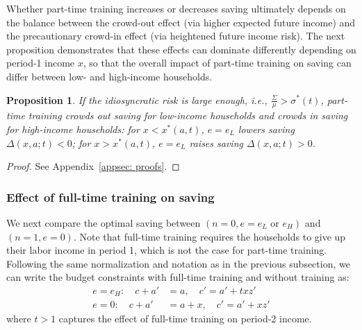\documentclass[12pt]{article}
\newtheorem{proposition}{Proposition}
\begin{document}
Whether part-time training increases or decreases saving ultimately depends on the balance between the crowd-out effect (via higher expected future income) and the precautionary crowd-in effect (via heightened future income risk). The next proposition demonstrates that these effects can dominate differently depending on period-1 income $x$, so that the overall impact of part-time training on saving can differ between low- and high-income households.



\begin{proposition}\label{prop:dadt}
    If the idiosyncratic risk is large enough, i.e., $\frac{\Sigma}{\mu}>\sigma^*(t)$, part-time training crowds out saving for low-income households and crowds in saving for high-income households: 
    for $x<x^\ast(a,t)$, $e=e_L$ lowers saving $\Delta(x,a;t)<0$; for $x>x^\ast(a,t)$, $e=e_L$ raises saving $\Delta(x,a;t)>0$.
\end{proposition}
\begin{proof}
    See Appendix~\ref{appsec: proofs}.
\end{proof}


\subsubsection{Effect of full-time training on saving}
We next compare the optimal saving between $(n=0,e=e_L \text{ or } e_H)$ and $(n=1,e=0)$. Note that  full-time training requires the households to give up their labor income in period 1, which is not the case for part-time training. Following the same normalization and notation as in the previous subsection, we can write the budget constraints with full-time training and without training as:
\begin{align}
e=e_H: \quad c + a' &= a, \quad c' = a' + txz'\\
e=0: \quad c + a' &= a + x, \quad c' = a' + xz'
\end{align}
where $t>1$ captures the effect of full-time training on period-2 income. 
\end{document}
